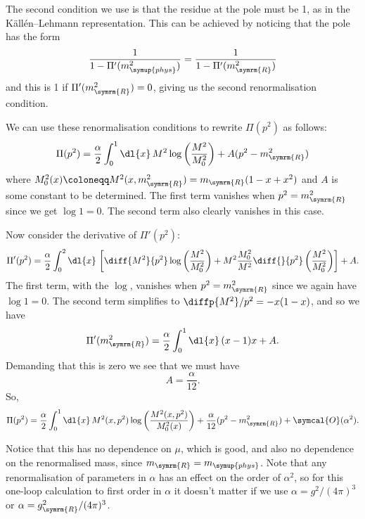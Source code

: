 \documentclass[fleqn]{NotesClass}
\newcommand{\order}{\symcal{O}}
\newcommand{\phys}{\symup{phys}}
\newcommand{\renormalised}{\symrm{R}}
\begin{document}
    The second condition we use is that the residue at the pole must be 1, as in the K\"all\'en--Lehmann representation.
    This can be achieved by noticing that the pole has the form
    \begin{equation}
        \frac{1}{1 - \Pi'(m_{\phys}^2)} = \frac{1}{1 - \Pi'(m_{\renormalised}^2)}
    \end{equation}
    and this is 1 if \(\Pi'(m_{\renormalised}^2) = 0\), giving us the second renormalisation condition.
    
    We can use these renormalisation conditions to rewrite \(\Pi(p^2)\) as follows:
    \begin{equation}
        \Pi(p^2) = \frac{\alpha}{2} \int_0^1 \dl{x} \, M^2 \log\left( \frac{M^2}{M_0^2} \right) + A(p^2 - m_{\renormalised}^2)
    \end{equation}
    where \(M_0^2(x) \coloneqq M^2(x, m_{\renormalised}^2) = m_{\renormalised}(1 - x + x^2)\) and \(A\) is some constant to be determined.
    The first term vanishes when \(p^2 = m_{\renormalised}^2\) since we get \(\log 1 = 0\).
    The second term also clearly vanishes in this case.
    
    Now consider the derivative of \(\Pi'(p^2)\):
    \begin{align}
        \Pi'(p^2) = \frac{\alpha}{2} \int_0^2 \dl{x} \, \left[ \diff{M^2}{p^2} \log\left( \frac{M^2}{M_0^2} \right) + M^2 \frac{M_0^2}{M^2} \diff{}{p^2} \left( \frac{M^2}{M_0^2} \right) \right] + A.
    \end{align}
    The first term, with the \(\log\), vanishes when \(p^2 = m_{\renormalised}^2\) since we again have \(\log 1 = 0\).
    The second term simplifies to \(\diffp{M^2}/{p^2} = -x(1 - x)\), and so we have
    \begin{equation}
        \Pi'(m_{\renormalised}^2) = \frac{\alpha}{2} \int_0^1 \dl{x} \, (x - 1)x + A.
    \end{equation}
    Demanding that this is zero we see that we must have
    \begin{equation}
        A = \frac{\alpha}{12}.
    \end{equation}
    So, 
    \begin{equation}
        \Pi(p^2) = \frac{\alpha}{2} \int_0^1 \dl{x} \, M^2(x, p^2) \log\left( \frac{M^2(x, p^2)}{M_0^2(x)} \right) + \frac{\alpha}{12}(p^2 - m_{\renormalised}^2) + \order(\alpha^2).
    \end{equation}
    
    Notice that this has no dependence on \(\mu\), which is good, and also no dependence on the renormalised mass, since \(m_{\renormalised} = m_{\phys}\).
    Note that any renormalisation of parameters in \(\alpha\) has an effect on the order of \(\alpha^2\), so for this one-loop calculation to first order in \(\alpha\) it doesn't matter if we use \(\alpha = g^2/(4\pi)^3\) or \(\alpha = g_{\renormalised}^2/(4\pi)^3\).
   
\end{document}

